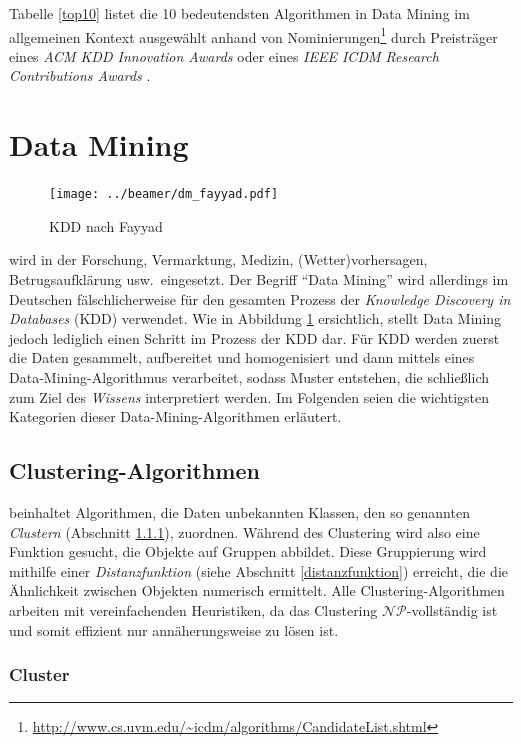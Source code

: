 \documentclass[12pt,journal,compsoc]{IEEEtran}
\begin{document}
Tabelle \ref{top10} listet die 10 bedeutendsten Algorithmen in Data Mining im allgemeinen Kontext ausgewählt anhand von Nominierungen\footnote{\url{http://www.cs.uvm.edu/~icdm/algorithms/CandidateList.shtml}} durch Preisträger eines \emph{ACM KDD Innovation Awards} oder eines \emph{IEEE ICDM Research Contributions Awards} \cite{wu2008top}.


\section{Data Mining}

\begin{figure}[!b]
  \centering
  \texttt{[image: ../beamer/dm\_fayyad.pdf]}
  \caption{KDD nach Fayyad \cite{fayyad1996data}}
  \label{kdd}
  \end{figure}
  
 wird in der Forschung, Vermarktung, Medizin, (Wetter)vorhersagen, Betrugsaufklärung usw.~eingesetzt. Der Begriff \enquote{Data Mining} wird allerdings im Deutschen fälschlicherweise für den gesamten Prozess der \emph{Knowledge Discovery in Databases} (KDD) verwendet. Wie in Abbildung \ref{kdd} ersichtlich, stellt Data Mining jedoch lediglich einen Schritt im Prozess der KDD dar. Für KDD werden zuerst die Daten gesammelt, aufbereitet und homogenisiert und dann mittels eines Data-Mining-Algorithmus verarbeitet, sodass Muster entstehen, die schließlich zum Ziel des \emph{Wissens} interpretiert werden. Im Folgenden seien die wichtigsten Kategorien dieser Data-Mining-Algorithmen erläutert.
 
\subsection{Clustering-Algorithmen}

 beinhaltet Algorithmen, die Daten unbekannten Klassen, den so genannten \emph{Clustern} (Abschnitt \ref{cluster}), zuordnen. Während des Clustering wird also eine Funktion gesucht, die Objekte auf Gruppen abbildet. Diese Gruppierung wird mithilfe
einer \emph{Distanzfunktion} (siehe Abschnitt \ref{distanzfunktion}) erreicht, die die Ähnlichkeit zwischen Objekten numerisch ermittelt.
Alle Clustering-Algorithmen arbeiten mit vereinfachenden Heuristiken, da das Clustering $\mathcal{NP}$-vollständig ist und somit effizient nur annäherungsweise zu lösen ist.

\subsubsection{Cluster} \label{cluster}
\end{document}
